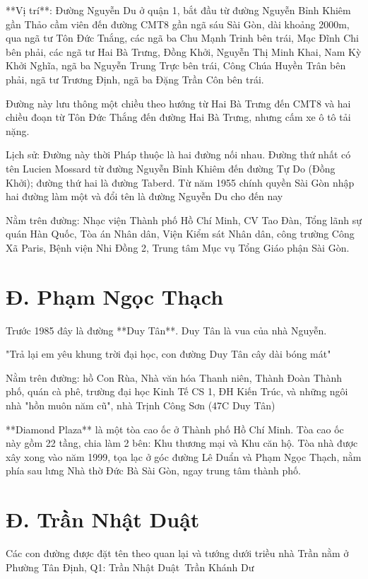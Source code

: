 **Vị trí**: Đường Nguyễn Du ở quận 1, bắt đầu từ đường Nguyễn Bỉnh Khiêm gần Thảo cầm viên đến đường CMT8 gần ngã sáu Sài Gòn, dài khoảng 2000m, qua ngã tư Tôn Đức Tnắng, các ngã ba Chu Mạnh Trinh bên trái, Mạc Đĩnh Chi bên phải, các ngã tư Hai Bà Trưng, Đồng Khởi, Nguyễn Thị Minh Khai, Nam Kỳ Khởi Nghĩa, ngã ba Nguyễn Trung Trực bên trái, Công Chúa Huyền Trân bên phải, ngã tư Trương Định, ngã ba Đặng Trần Côn bên trái.

Đường này lưu thông một chiều theo hướng từ Hai Bà Trưng đến CMT8 và hai chiều đoạn từ Tôn Đức Thắng đến đường Hai Bà Trưng, nhưng cấm xe ô tô tải nặng.

Lịch sử: Đường này thời Pháp thuộc là hai đường nối nhau. Đường thứ nhất có tên Lucien Mossard từ đường Nguyễn Bỉnh Khiêm đến đường Tự Do (Đồng Khởi); đường thứ hai là đường Taberd. Từ năm 1955 chính quyền Sài Gòn nhập hai đường làm một và đổi tên là đường Nguyễn Du cho đến nay

Nằm trên đường: Nhạc viện Thành phố Hồ Chí Minh, CV Tao Đàn, Tổng lãnh sự quán Hàn Quốc, Tòa án Nhân dân, Viện Kiểm sát Nhân dân, công trường Công Xã Paris, Bệnh viện Nhi Đồng 2, Trung tâm Mục vụ Tổng Giáo phận Sài Gòn.

\section{Đ. Phạm Ngọc Thạch}

Trước 1985 đây là đường **Duy Tân**. Duy Tân là vua của nhà Nguyễn.

"Trả lại em yêu khung trời đại học, con đường Duy Tân cây dài bóng mát"

Nằm trên đường: hồ Con Rùa, Nhà văn hóa Thanh niên, Thành Đoàn Thành phố, quán cà phê, trường đại học Kinh Tế CS 1, ĐH Kiến Trúc, và những ngôi nhà "hồn muôn năm cũ", nhà Trịnh Công Sơn (47C Duy Tân)

**Diamond Plaza** là một tòa cao ốc ở Thành phố Hồ Chí Minh. Tòa cao ốc này gồm 22 tầng, chia làm 2 bên: Khu thương mại và Khu căn hộ. Tòa nhà được xây xong vào năm 1999, tọa lạc ở góc đường Lê Duẩn và Phạm Ngọc Thạch, nằm phía sau lưng Nhà thờ Đức Bà Sài Gòn, ngay trung tâm thành phố.

\section{Đ. Trần Nhật Duật}

Các con đường được đặt tên theo quan lại và tướng dưới triều nhà Trần nằm ở Phường Tân Định, Q1:
Trần Nhật Duật\
Trần Khánh Dư

